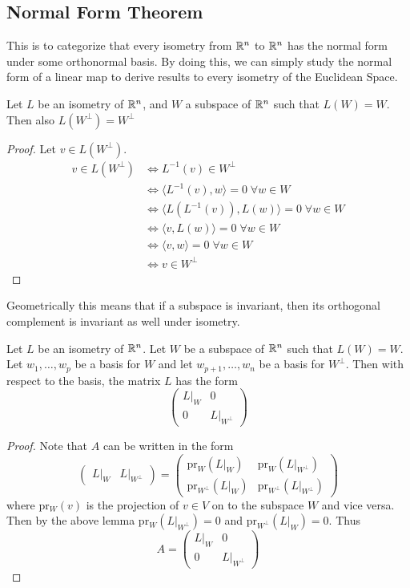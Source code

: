 \documentclass[a4paper]{article}
\begin{document}
\subsection{Normal Form Theorem}
This is to categorize that every isometry from $\mathbb{R}^n$ to $\mathbb{R}^n$ has the normal form under some orthonormal basis. By doing this, we can simply study the normal form of a linear map to derive results to every isometry of the Euclidean Space. 
\begin{lmm}{}{} Let $L$ be an isometry of $\mathbb{R}^n$, and $W$ a subspace of $\mathbb{R}^n$ such that $L(W)=W$. Then also $L(W^\perp)=W^\perp$\tcbline
\begin{proof} Let $v\in L(W^{\perp})$. 
\begin{align*}
v\in L(W^\perp)&\iff L^{-1}(v)\in W^\perp\\
&\iff\langle L^{-1}(v),w\rangle=0\;\forall w\in W\\
&\iff\langle L(L^{-1}(v)),L(w)\rangle=0\;\forall w\in W\\
&\iff\langle v,L(w)\rangle=0\;\forall w\in W\\
&\iff\langle v,w\rangle=0\;\forall w\in W\\
&\iff v\in W^\perp
\end{align*}
\end{proof}
\end{lmm}

Geometrically this means that if a subspace is invariant, then its orthogonal complement is invariant as well under isometry. 

\begin{crl}{}{} Let $L$ be an isometry of $\mathbb{R}^n$. Let $W$ be a subspace of $\mathbb{R}^n$ such that $L(W)=W$. Let $w_1,\dots,w_p$ be a basis for $W$ and let $w_{p+1},\dots,w_n$ be a basis for $W^\perp$. Then with respect to the basis, the matrix $L$ has the form $$\begin{pmatrix}
L|_W & 0\\
0 & L|_{W^\perp}
\end{pmatrix}$$\tcbline
\begin{proof}
Note that $A$ can be written in the form $$\begin{pmatrix}L|_W & L|_{W^\perp}\end{pmatrix}=\begin{pmatrix}\text{pr}_W(L|_W) & \text{pr}_W(L|_{W^\perp})\\ \text{pr}_{W^\perp}(L|_W) & \text{pr}_{W^\perp}(L|_{W^\perp})\end{pmatrix}$$ where pr$_W(v)$ is the projection of $v\in V$ on to the subspace $W$ and vice versa. Then by the above lemma pr$_W(L|_{W^\perp})=0$ and pr$_{W^\perp}(L|_W)=0$. Thus $$A=\begin{pmatrix}
L|_W & 0\\
0 & L|_{W^\perp}
\end{pmatrix}$$
\end{proof}
\end{crl}
\end{document}
